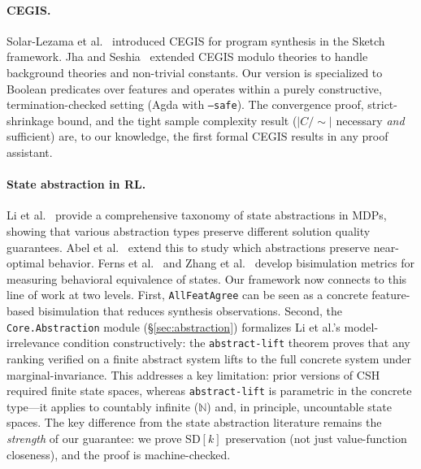 \documentclass[9pt,a4paper]{article}
\theoremstyle{plain}
\theoremstyle{definition}
\theoremstyle{remark}
\begin{document}
\paragraph{CEGIS.}  Solar-Lezama et al.~\cite{SolarLezama2006} introduced CEGIS for program synthesis in the Sketch framework.  Jha and Seshia~\cite{Jha2017} extended CEGIS modulo theories to handle background theories and non-trivial constants.  Our version is specialized to Boolean predicates over features and operates within a purely constructive, termination-checked setting (Agda with \texttt{--safe}).  The convergence proof, strict-shrinkage bound, and the tight sample complexity result ($|C/{\sim}|$ necessary \emph{and} sufficient) are, to our knowledge, the first formal CEGIS results in any proof assistant.

\paragraph{State abstraction in RL.}  Li et al.~\cite{Li2006} provide a comprehensive taxonomy of state abstractions in MDPs, showing that various abstraction types preserve different solution quality guarantees.  Abel et al.~\cite{Abel2018} extend this to study which abstractions preserve near-optimal behavior.  Ferns et al.~\cite{Ferns2004} and Zhang et al.~\cite{Zhang2021} develop bisimulation metrics for measuring behavioral equivalence of states.  Our framework now connects to this line of work at two levels.  First, \texttt{AllFeatAgree} can be seen as a concrete feature-based bisimulation that reduces synthesis observations.  Second, the \texttt{Core.Abstraction} module (\S\ref{sec:abstraction}) formalizes Li et al.'s model-irrelevance condition constructively: the \texttt{abstract-lift} theorem proves that any ranking verified on a finite abstract system lifts to the full concrete system under marginal-invariance.  This addresses a key limitation: prior versions of CSH required finite state spaces, whereas \texttt{abstract-lift} is parametric in the concrete type---it applies to countably infinite ($\mathbb{N}$) and, in principle, uncountable state spaces.  The key difference from the state abstraction literature remains the \emph{strength} of our guarantee: we prove SD$[k]$ preservation (not just value-function closeness), and the proof is machine-checked.
\end{document}

